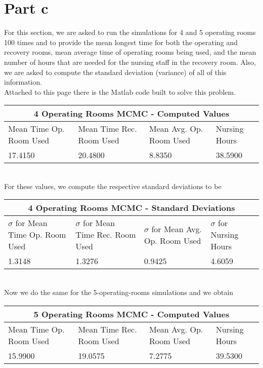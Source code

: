 \section{Part c}
For this section, we are asked to run the simulations for 4 and 5 operating rooms 100 times and to provide  the mean longest time for both the operating and recovery rooms, mean average time of operating rooms being used, and the mean number of hours that are needed
for the nursing staff in the recovery room. Also, we are asked to compute the standard deviation (variance) of all of this information.\\
Attached to this page there is the Matlab code built to solve this problem.\\

\begin{tabular}{ |p{3cm}||p{3cm}|p{3cm}|p{3cm}|  }
 \hline
 \multicolumn{4}{|c|}{4 Operating Rooms MCMC - Computed Values} \\
 \hline
 Mean Time Op. Room Used&Mean Time Rec. Room Used&Mean Avg. Op. Room Used&Nursing Hours\\
 \hline
 17.4150  & 20.4800 & 8.8350 &   38.5900\\
 \hline
 \end{tabular}\\
 
 For these values, we compute the respective standard deviations to be
 \vspace{0.1mm}
 
  \begin{tabular}{ |p{3cm}||p{3cm}|p{3cm}|p{3cm}|  }
  \hline
  \multicolumn{4}{|c|}{4 Operating Rooms MCMC - Standard Deviations} \\
   \hline
 $\sigma$ for Mean Time Op. Room Used&$\sigma$ for Mean Time Rec. Room Used&$\sigma$ for Mean Avg. Op. Room Used&$\sigma$ for Nursing Hours\\
 \hline
 1.3148&  1.3276 & 0.9425 &4.6059\\
 \hline
\end{tabular}\\

\vspace{2mm}
Now we do the same for the 5-operating-rooms simulations and we obtain

\begin{tabular}{ |p{3cm}||p{3cm}|p{3cm}|p{3cm}|  }
 \hline
 \multicolumn{4}{|c|}{5 Operating Rooms MCMC - Computed Values} \\
 \hline
 Mean Time Op. Room Used&Mean Time Rec. Room Used&Mean Avg. Op. Room Used&Nursing Hours\\
 \hline
 15.9900  & 19.0575 & 7.2775 &   39.5300\\
 \hline
 \end{tabular}\\
 
